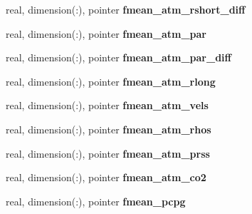 \begin{DoxyCompactItemize}
\item 
\hypertarget{structed__state__vars_1_1edtype_a45b87d8855837436f9dbb67af4d33404}{
real, dimension(:), pointer {\bfseries fmean\_\-atm\_\-rshort\_\-diff}}
\label{structed__state__vars_1_1edtype_a45b87d8855837436f9dbb67af4d33404}

\item 
\hypertarget{structed__state__vars_1_1edtype_ae42348331464051a1cb4a38fcc809f61}{
real, dimension(:), pointer {\bfseries fmean\_\-atm\_\-par}}
\label{structed__state__vars_1_1edtype_ae42348331464051a1cb4a38fcc809f61}

\item 
\hypertarget{structed__state__vars_1_1edtype_aaac226fe8da25b95d6cb9c02f25701c0}{
real, dimension(:), pointer {\bfseries fmean\_\-atm\_\-par\_\-diff}}
\label{structed__state__vars_1_1edtype_aaac226fe8da25b95d6cb9c02f25701c0}

\item 
\hypertarget{structed__state__vars_1_1edtype_ae37207764a706370927cfbefbe16d311}{
real, dimension(:), pointer {\bfseries fmean\_\-atm\_\-rlong}}
\label{structed__state__vars_1_1edtype_ae37207764a706370927cfbefbe16d311}

\item 
\hypertarget{structed__state__vars_1_1edtype_a48cd9c4f8b2b7250ca08e6f8dc9dbe67}{
real, dimension(:), pointer {\bfseries fmean\_\-atm\_\-vels}}
\label{structed__state__vars_1_1edtype_a48cd9c4f8b2b7250ca08e6f8dc9dbe67}

\item 
\hypertarget{structed__state__vars_1_1edtype_aaa6b5654ff1bce2b3ca8988cf8be34f8}{
real, dimension(:), pointer {\bfseries fmean\_\-atm\_\-rhos}}
\label{structed__state__vars_1_1edtype_aaa6b5654ff1bce2b3ca8988cf8be34f8}

\item 
\hypertarget{structed__state__vars_1_1edtype_ad74322ee1a7ed969c04fdb40ad6b20ce}{
real, dimension(:), pointer {\bfseries fmean\_\-atm\_\-prss}}
\label{structed__state__vars_1_1edtype_ad74322ee1a7ed969c04fdb40ad6b20ce}

\item 
\hypertarget{structed__state__vars_1_1edtype_a9d39f7b176b0108081cdb7a916d5e918}{
real, dimension(:), pointer {\bfseries fmean\_\-atm\_\-co2}}
\label{structed__state__vars_1_1edtype_a9d39f7b176b0108081cdb7a916d5e918}

\item 
\hypertarget{structed__state__vars_1_1edtype_adc3b5592e4137053ff88bba54beca7b0}{
real, dimension(:), pointer {\bfseries fmean\_\-pcpg}}
\label{structed__state__vars_1_1edtype_adc3b5592e4137053ff88bba54beca7b0}


\end{DoxyCompactItemize}
